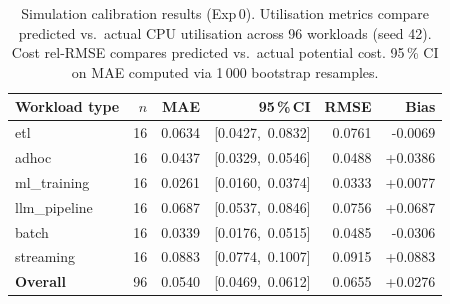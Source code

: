 \begin{table}[t]
\centering
\caption{Simulation calibration results (Exp\,0). Utilisation metrics compare predicted vs.\ actual CPU utilisation across 96 workloads (seed 42). Cost rel-RMSE compares predicted vs.\ actual potential cost. 95\,\% CI on MAE computed via 1\,000 bootstrap resamples.}
\label{tab:calibration}
\begin{tabular}{lrrrrr}
\toprule
Workload type & $n$ & MAE & 95\,\%\,CI & RMSE & Bias \\
\midrule
etl & 16 & 0.0634 & [0.0427,\ 0.0832] & 0.0761 & -0.0069 \\
adhoc & 16 & 0.0437 & [0.0329,\ 0.0546] & 0.0488 & +0.0386 \\
ml\_training & 16 & 0.0261 & [0.0160,\ 0.0374] & 0.0333 & +0.0077 \\
llm\_pipeline & 16 & 0.0687 & [0.0537,\ 0.0846] & 0.0756 & +0.0687 \\
batch & 16 & 0.0339 & [0.0176,\ 0.0515] & 0.0485 & -0.0306 \\
streaming & 16 & 0.0883 & [0.0774,\ 0.1007] & 0.0915 & +0.0883 \\
\midrule
\textbf{Overall} & 96 & 0.0540 & [0.0469,\ 0.0612] & 0.0655 & +0.0276 \\
\bottomrule
\end{tabular}
\end{table}